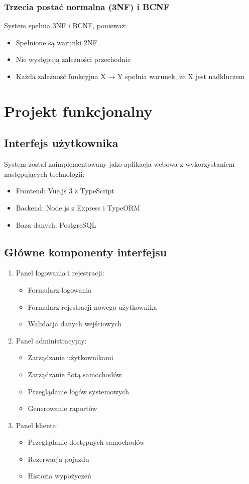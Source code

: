 \documentclass[12pt]{article}
\begin{document}
\subsubsection{Trzecia postać normalna (3NF) i BCNF}
System spełnia 3NF i BCNF, ponieważ:
\begin{itemize}
    \item Spełnione są warunki 2NF
    \item Nie występują zależności przechodnie
    \item Każda zależność funkcyjna X → Y spełnia warunek, że X jest nadkluczem
\end{itemize}

\section{Projekt funkcjonalny}

\subsection{Interfejs użytkownika}
System został zaimplementowany jako aplikacja webowa z wykorzystaniem następujących technologii:
\begin{itemize}
    \item Frontend: Vue.js 3 z TypeScript
    \item Backend: Node.js z Express i TypeORM
    \item Baza danych: PostgreSQL
\end{itemize}

\subsection{Główne komponenty interfejsu}
\begin{enumerate}
    \item Panel logowania i rejestracji:
    \begin{itemize}
        \item Formularz logowania
        \item Formularz rejestracji nowego użytkownika
        \item Walidacja danych wejściowych
    \end{itemize}

    \item Panel administracyjny:
    \begin{itemize}
        \item Zarządzanie użytkownikami
        \item Zarządzanie flotą samochodów
        \item Przeglądanie logów systemowych
        \item Generowanie raportów
    \end{itemize}

    \item Panel klienta:
    \begin{itemize}
        \item Przeglądanie dostępnych samochodów
        \item Rezerwacja pojazdu
        \item Historia wypożyczeń
    \end{itemize}
\end{enumerate}
\newpage
\end{document}
